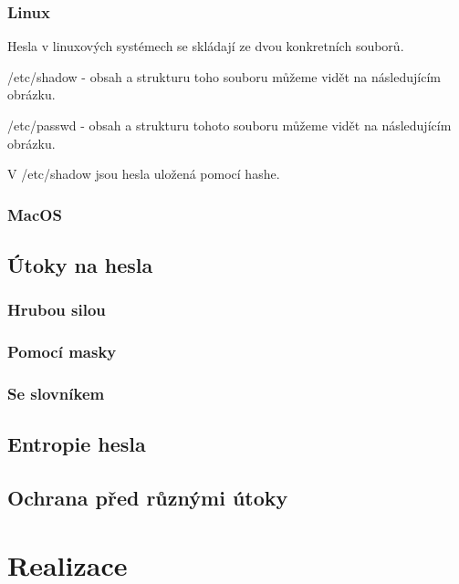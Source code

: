 \documentclass[thesis=B,czech]{FITthesis}[2019/12/23]
\begin{document}
\subsection{Linux}

Hesla v linuxových systémech se skládají ze dvou konkretních souborů. 

/etc/shadow - obsah a strukturu toho souboru můžeme vidět na následujícím obrázku. 


/etc/passwd - obsah a strukturu tohoto souboru můžeme vidět na následujícím obrázku.


V /etc/shadow jsou hesla uložená pomocí hashe. 

\subsection{MacOS}


\section{Útoky na hesla}

\subsection{Hrubou silou}

\subsection{Pomocí masky}

\subsection{Se slovníkem}

\section{Entropie hesla}

\section{Ochrana před různými útoky}

\chapter{Realizace}
\end{document}
